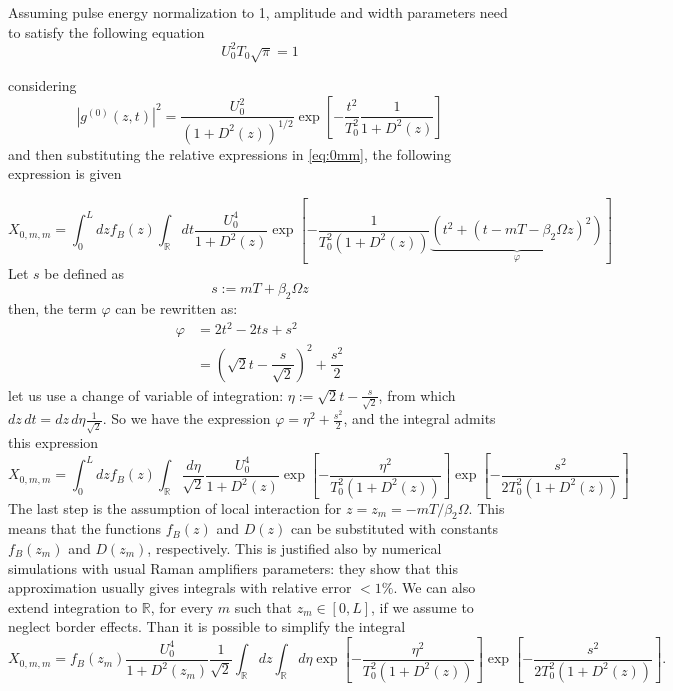 \documentclass[10pt, lettersize, journal, onecolumn]{IEEEtran}
\begin{document}
Assuming pulse energy normalization to 1, amplitude and width parameters need to satisfy the following equation
\begin{equation}\label{eq:normie}
	U_0^2T_0 \sqrt{\pi} = 1
\end{equation}

considering
\begin{equation}
	|g^{(0)}(z, t)|^2 = \dfrac{U_0^2}{(1+D^2(z))^{1/2}}\exp\left[-\dfrac{t^2}{T_0^2} \dfrac{1}{1+D^2(z)}\right] 
\end{equation}
and then substituting the relative expressions in \ref{eq:0mm}, the following expression is given

\begin{equation}
	X_{0, m, m} = \int_{0}^{L}dz f_B(z) \int_{\mathbb{R}}dt \dfrac{U_0^4}{1+D^2(z)} \exp\left[-\dfrac{1}{T_0^2(1+D^2(z))} \underbrace{\left(t^2 + (t-mT-\beta_2\Omega z)^2\right)}_{\varphi}\right]
\end{equation}
Let $s$ be defined as
\begin{equation}
	s := mT+\beta_2\Omega z
\end{equation}
then, the term $\varphi$ can be rewritten as:
\begin{align}
	\varphi &= 2t^2 - 2ts + s^2 \\
	&= \left(\sqrt{2}t - \dfrac{s}{\sqrt{2}}\right)^2 + \dfrac{s^2}{2}
\end{align}
let us use a change of variable of integration: $\eta := \sqrt{2}t - \frac{s}{\sqrt{2}}$, from which $dz\,dt = dz\,d\eta \frac{1}{\sqrt{2}}$.
So we have the expression $\varphi = \eta^2 + \frac{s^2}{2}$, and the integral admits this expression
\begin{equation}
	X_{0, m, m} = \int_{0}^{L}dz f_B(z) \int_{\mathbb{R}}\dfrac{d\eta}{\sqrt{2}}
	\dfrac{U_0^4}{1+D^2(z)} \exp\left[-\dfrac{\eta^2}{T_0^2(1+D^2(z))} \right] \exp\left[-\dfrac{s^2}{2T_0^2(1+D^2(z))} \right]
\end{equation}
The last step is the assumption of local interaction for $z=z_m=-mT/\beta_2\Omega$. This means that the functions $f_B(z)$ and $D(z)$ can be substituted with constants $f_B(z_m)$ and $D(z_m)$, respectively. This is justified also by numerical simulations with usual Raman amplifiers parameters: they show that this approximation usually gives integrals with relative error $<1\%$. 
We can also extend integration to $\mathbb{R}$, for every $m$ such that $z_m \in [0, L]$, if we assume to neglect border effects.
Than it is possible to simplify the integral
\begin{equation}
	X_{0, m, m} = f_B(z_m) \dfrac{U_0^4}{1+D^2(z_m)}  \dfrac{1}{\sqrt{2}}\int_{\mathbb{R}}dz \int_{\mathbb{R}}d\eta
	\exp\left[-\dfrac{\eta^2}{T_0^2(1+D^2(z))} \right] \exp\left[-\dfrac{s^2}{2T_0^2(1+D^2(z))} \right].
\end{equation}
\end{document}
